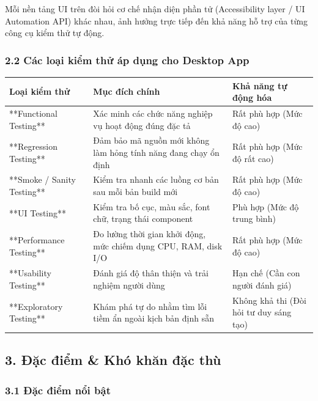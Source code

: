 Mỗi nền tảng UI trên đòi hỏi cơ chế nhận diện phần tử (Accessibility layer / UI Automation API) khác nhau, ảnh hưởng trực tiếp đến khả năng hỗ trợ của từng công cụ kiểm thử tự động.

\subsubsection{2.2 Các loại kiểm thử áp dụng cho Desktop App}

\begin{table}[H]
\centering
\begin{tabular}{|l|l|l|}
\hline
\textbf{Loại kiểm thử} & \textbf{Mục đích chính} & \textbf{Khả năng tự động hóa} \\ \hline
**Functional Testing** & Xác minh các chức năng nghiệp vụ hoạt động đúng đặc tả & Rất phù hợp (Mức độ cao) \\ \hline
**Regression Testing** & Đảm bảo mã nguồn mới không làm hỏng tính năng đang chạy ổn định & Rất phù hợp (Mức độ rất cao) \\ \hline
**Smoke / Sanity Testing** & Kiểm tra nhanh các luồng cơ bản sau mỗi bản build mới & Rất phù hợp (Mức độ cao) \\ \hline
**UI Testing** & Kiểm tra bố cục, màu sắc, font chữ, trạng thái component & Phù hợp (Mức độ trung bình) \\ \hline
**Performance Testing** & Đo lường thời gian khởi động, mức chiếm dụng CPU, RAM, disk I/O & Rất phù hợp (Mức độ cao) \\ \hline
**Usability Testing** & Đánh giá độ thân thiện và trải nghiệm người dùng & Hạn chế (Cần con người đánh giá) \\ \hline
**Exploratory Testing** & Khám phá tự do nhằm tìm lỗi tiềm ẩn ngoài kịch bản định sẵn & Không khả thi (Đòi hỏi tư duy sáng tạo) \\ \hline
\end{tabular}
\end{table}





\subsection{3. Đặc điểm \& Khó khăn đặc thù}

\subsubsection{3.1 Đặc điểm nổi bật}

